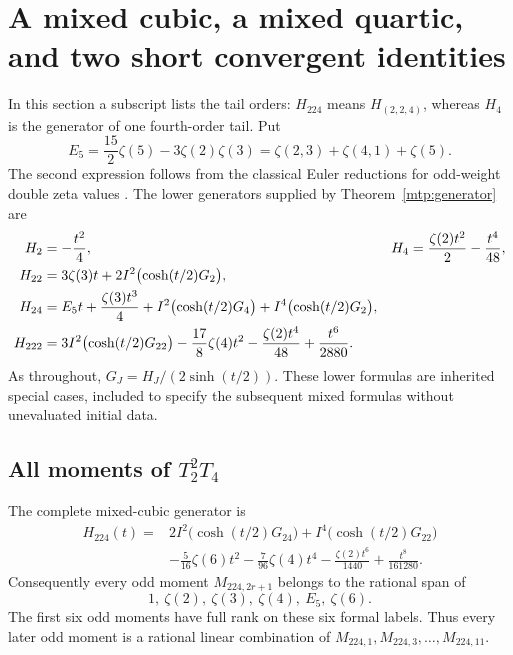 \section{A mixed cubic, a mixed quartic, and two short convergent identities}
\label{mtp:examples}

In this section a subscript lists the tail orders: $H_{224}$ means
$H_{(2,2,4)}$, whereas $H_4$ is the generator of one fourth-order tail.
Put
\begin{equation}\label{mtp:E5}
 E_5=\frac{15}{2}\zeta(5)-3\zeta(2)\zeta(3)
     =\zeta(2,3)+\zeta(4,1)+\zeta(5).
\end{equation}
The second expression follows from the classical Euler reductions for
odd-weight double zeta values \cite[Equations (4), (9)]{Hoffman}.
The lower generators supplied by Theorem~\ref{mtp:generator} are
\begin{align}
 H_2&=-\frac{t^2}{4},
 &H_4&=\frac{\zeta(2)t^2}{2}-\frac{t^4}{48},\label{mtp:single-generators}\\
 H_{22}&=3\zeta(3)t+2I^2\bigl(\cosh(t/2)G_2\bigr),\notag\\
 H_{24}&=E_5t+\frac{\zeta(3)t^3}{4}
       +I^2\bigl(\cosh(t/2)G_4\bigr)
       +I^4\bigl(\cosh(t/2)G_2\bigr),\label{mtp:lower-generators}\\
 H_{222}&=3I^2\bigl(\cosh(t/2)G_{22}\bigr)
      -\frac{17}{8}\zeta(4)t^2-\frac{\zeta(2)t^4}{48}
      +\frac{t^6}{2880}.\notag
\end{align}
As throughout, $G_J=H_J/(2\sinh(t/2))$. These lower formulas are
inherited special cases, included to specify the subsequent mixed
formulas without unevaluated initial data.

\subsection{All moments of \texorpdfstring{$T_2^2T_4$}{T2 squared times T4}}

\begin{theorem}
\label{mtp:triple}
The complete mixed-cubic generator is
\begin{equation}\label{mtp:H224}
 \boxed{\begin{aligned}
 H_{224}(t)={}&2I^2\bigl(\cosh(t/2)G_{24}\bigr)
                 +I^4\bigl(\cosh(t/2)G_{22}\bigr)\\
       &-\frac5{16}\zeta(6)t^2-\frac7{96}\zeta(4)t^4
                    -\frac{\zeta(2)t^6}{1440}+\frac{t^8}{161280}.
 \end{aligned}}
\end{equation}
Consequently every odd moment $M_{224,2r+1}$ belongs to the rational
span of
\begin{equation}\label{mtp:triple-coordinates}
                         1,\ \zeta(2),\ \zeta(3),\ \zeta(4),\ E_5,\ \zeta(6).
\end{equation}
The first six odd moments have full rank on these six formal labels.
Thus every later odd moment is a rational linear combination of
$M_{224,1},M_{224,3},\ldots,M_{224,11}$.
\end{theorem}

